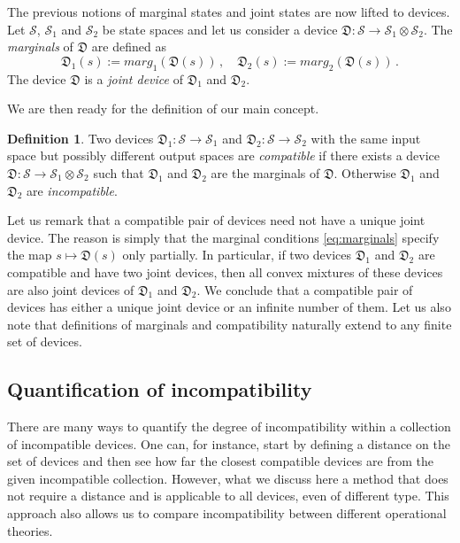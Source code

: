 \documentclass[12pt]{article}
\theoremstyle{definition}
\newtheorem*{definition*}{Definition}
\newcommand{\Dev}{\mathfrak{D}} %
\begin{document}
The previous notions of marginal states and joint states are now lifted to devices. 
Let $\mathcal{S}$, $\mathcal{S}_1$ and $\mathcal{S}_2$ be state spaces and let us consider a device $\Dev:\mathcal{S}\to\mathcal{S}_1 \otimes \mathcal{S}_2$.
The \emph{marginals} of $\Dev$ are defined as
\begin{equation}\label{eq:marginals}
\Dev_1(s) := marg_1(\Dev(s)) \, , \quad \Dev_2(s) := marg_2(\Dev(s)) \, .
\end{equation}
The device $\Dev$ is a \emph{joint device} of $\Dev_1$ and $\Dev_2$.

We are then ready for the definition of our main concept.


\begin{definition*}
Two devices $\Dev_1: \mathcal{S} \to \mathcal{S}_1$ and 
$\Dev_2: \mathcal{S} \to \mathcal{S}_2$ with the same input space but possibly different output spaces are \emph{compatible} if there exists a device $\Dev: \mathcal{S} \to \mathcal{S}_1 \otimes \mathcal{S}_2$ such that $\Dev_1$ and $\Dev_2$ are the marginals of $\Dev$.
Otherwise $\Dev_1$ and $\Dev_2$ are \emph{incompatible}.
\end{definition*}

Let us remark that a compatible pair of devices need not have a unique joint device. The reason is simply that the marginal conditions \eqref{eq:marginals} specify the map $s \mapsto  \Dev(s)$ only partially. In particular, if two devices $\Dev_1$ and $\Dev_2$ are compatible and have two joint devices, then all convex mixtures of these  devices are also joint devices of $\Dev_1$ and $\Dev_2$. 
We conclude that a compatible pair of devices has either a unique joint device or an infinite number of them.  Let us also note that definitions of marginals and compatibility naturally extend to any finite set of devices. 

\subsection{Quantification of incompatibility}\label{sec:degree}

There are many ways to quantify the degree of incompatibility within a collection of incompatible devices. 
One can, for instance, start by defining a distance on the set of devices and then see how far the closest compatible devices are from the given incompatible collection.
However, what we discuss here a method that does not require a distance and is applicable to all devices, even of different type. 
This approach also allows us to compare incompatibility between different operational theories.
\end{document}
